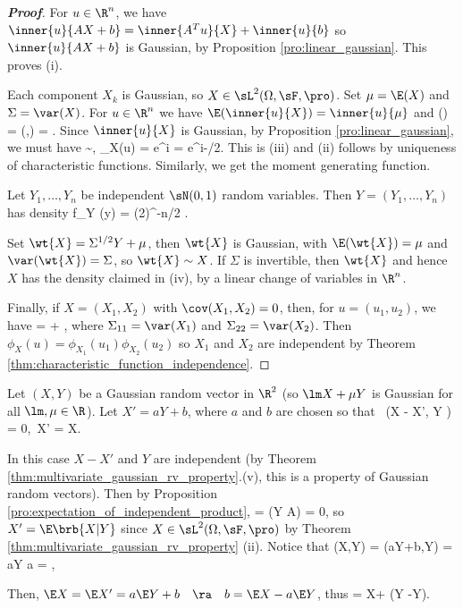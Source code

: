 \begin{proof}[\bf Proof]
For $u \in \R^n$, we have $\inner{u}{AX+b} = \inner{A^Tu}{X}+ \inner{u}{b}$ so $\inner{u}{AX+b}$ is Gaussian, by Proposition \ref{pro:linear_gaussian}. This proves (i).

Each component $X_k$ is Gaussian, so $X \in \sL^2(\Omega,\sF,\pro)$. Set $\mu = \E(X)$ and $\Sigma = \var(X)$. For $u \in \R^n$ we have $\E(\inner{u}{X}) = \inner{u}{\mu}$ and \be \var() =
\cov(,) = . \ee Since $\inner{u}{X}$ is Gaussian, by Proposition \ref{pro:linear_gaussian}, we must have \be {} \sim \sN{},\quad\quad
\phi_X(u) = \E e^{i} = e^{i-/2}. \ee This is (iii) and (ii) follows by uniqueness of characteristic functions. Similarly, we get the moment generating function.

Let $Y_1, \dots, Y_n$ be independent $\sN(0, 1)$ random variables. Then $Y = (Y_1,\dots, Y_n)$ has density
\be
f_Y (y) = (2\pi)^{-n/2} \exp{}.
\ee

Set $\wt{X} = \Sigma^{1/2}Y +\mu$, then $\wt{X}$ is Gaussian, with $\E(\wt{X}) = \mu$ and $\var(\wt{X} ) = \Sigma$, so $\wt{X} \sim X$. If $\Sigma$ is invertible, then $\wt{X}$ and hence $X$ has the density claimed in (iv), by a linear change of variables in $\R^n$.

Finally, if $X = (X_1,X_2)$ with $\cov(X_1,X_2) = 0$, then, for $u = (u_1, u_2)$, we have
\be
{} =  + ,
\ee
where $\Sigma_{11} = \var(X_1)$ and $\Sigma_{22} = \var(X_2)$. Then $\phi_X(u) = \phi_{X_1}(u_1)\phi_{X_2}(u_2)$ so $X_1$ and $X_2$ are independent by Theorem \ref{thm:characteristic_function_independence}.
\end{proof}

\begin{example}
Let $(X, Y)$ be a Gaussian random vector in $\R^2$ (so $\lm X + \mu Y$ is Gaussian for all $\lm,\mu \in \R$). Let $X' = aY + b$, where $a$ and $b$ are chosen so that
\be
{}\ \cov(X - X', Y ) = 0,\quad\quad {}\ \E X' = \E X.
\ee

In this case $X - X'$ and $Y$ are independent (by Theorem \ref{thm:multivariate_gaussian_rv_property}.(v), this is a property of Gaussian random vectors). Then by Proposition \ref{pro:expectation_of_independent_product},
\be
\E{} = \E{}\pro(Y \in A) = 0,
\ee
so $X' = \E\brb{X | Y}$ since $X\in \sL^2(\Omega,\sF,\pro)$ by Theorem \ref{thm:multivariate_gaussian_rv_property} (ii). Notice that
\be
\cov(X,Y) = \cov(aY+b,Y) = a\var Y \quad\ra\quad a = ,
\ee

Then, $\E X = \E X' = a\E Y + b \quad\ra\quad b = \E X - a\E Y$, thus
\be
\E{} = \E X+  (Y -\E Y).
\ee
\end{example}

